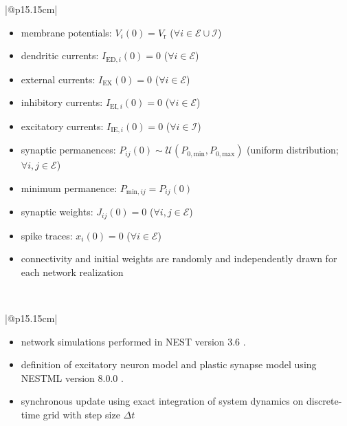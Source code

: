 \documentclass[10pt,a4paper,twoside,american]{article}
\newcommand{\dtsim}{\Delta t}
\newcommand{\J}{J}                          %
\begin{document}
\begin{table}
\begin{tabular}{|@{\hspace*{1mm}}p{15.15cm}|}
   \\
    \begin{itemize}
    \item membrane potentials: $V_i(0)=V_\text{r}$ ($\forall{}i\in\mathcal{E}\cup\mathcal{I}$)
    \item dendritic currents: $I_{\text{ED},i}(0)=0$ ($\forall{}i\in\mathcal{E}$)
    \item external currents: $I_{\text{EX}}(0)=0$ ($\forall{}i\in\mathcal{E}$)
    \item inhibitory currents: $I_{\text{EI},i}(0)=0$ ($\forall{}i\in\mathcal{E}$)
    \item excitatory currents: $I_{\text{IE},i}(0)=0$ ($\forall{}i\in\mathcal{I}$)
    \item synaptic permanences: $P_{ij}(0)\sim\mathcal{U}(P_{0,\text{min}},P_{0,\text{max}})$ (uniform distribution; $\forall{}i,j\in\mathcal{E}$)
    \item minimum permanence: $P_{\text{min},ij} = P_{ij}(0)$
    \item synaptic weights: $\J_{ij}(0)=0$ ($\forall{}i,j\in\mathcal{E}$)
    \item spike traces: $x_i(0)=0$ ($\forall{}i\in\mathcal{E}$)
    \item connectivity and initial weights are randomly and independently drawn for each network realization
    \end{itemize}\\
    \hline
  \end{tabular}
 \begin{tabular}{|@{\hspace*{1mm}}p{15.15cm}|}
  \\
  \hline
  \begin{itemize}
  \item network simulations performed in NEST \citep{Gewaltig_07_11204} version 3.6 \citep{Nest360}.
  \item definition of excitatory neuron model and plastic synapse model using NESTML \citep{Plotnikov16_93,Linssen25_1544143} version 8.0.0 \citep{Linssen24_nestml8.0.0}.
  \item synchronous update using exact integration of system dynamics on discrete-time grid with step size $\dtsim$ \cite{Rotter99a}
  \end{itemize}
  \\
  \hline
\end{tabular}
\caption{Description of the initial conditions and simulation details. Parameter values are given in \cref{tab:Model-parameters}.}
\label{tab:Model-description-initcond}
\end{table}
\end{document}
